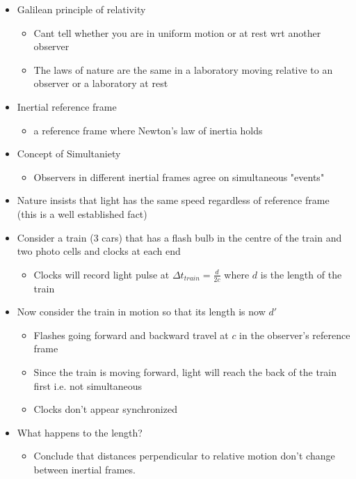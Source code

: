 \documentclass[12pt]{article}
\begin{document}
\begin{itemize}
    \item Galilean principle of relativity \begin{itemize}
        \item Cant tell whether you are in uniform motion or at rest wrt another observer
        \item The laws of nature are the same in a laboratory moving relative to an observer or a laboratory at rest
    \end{itemize}
    \item Inertial reference frame \begin{itemize}
        \item a reference frame where Newton's law of inertia holds
    \end{itemize}
    \item Concept of Simultaniety \begin{itemize}
        \item Observers in different inertial frames agree on simultaneous "events"
    \end{itemize}
    \item Nature insists that light has the same speed regardless of reference frame (this is a well established fact)
    \item Consider a train (3 cars) that has a flash bulb in the centre of the train and two photo cells and clocks at each end \begin{itemize}
        \item Clocks will record light pulse at $\Delta t_{train} = \frac{d}{2c}$ where $d$ is the length of the train
    \end{itemize}
    \item Now consider the train in motion so that its length is now $d'$ \begin{itemize}
        \item Flashes going forward and backward travel at $c$ in the observer's reference frame
        \item Since the train is moving forward, light will reach the back of the train first i.e. not simultaneous
        \item Clocks don't appear synchronized
    \end{itemize}
    \item What happens to the length? \begin{itemize}
        \item Conclude that distances perpendicular to relative motion don't change between inertial frames. 

\end{itemize}
\end{itemize}
\end{document}

